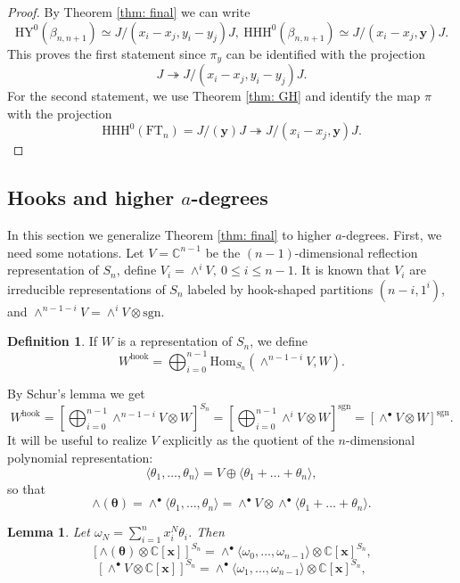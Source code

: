 \documentclass{amsart}
\newcommand{\C}{\mathbb{C}}
\newcommand{\xx}{\mathbf{x}}
\newcommand{\yy}{\mathbf{y}}
\newcommand{\ttheta}{\boldsymbol{\theta}}
\newcommand{\FT}{\mathrm{FT}}
\newcommand{\HY}{\mathrm{HY}}
\newcommand{\sgn}{\mathrm{sgn}}
\newcommand{\HHH}{\mathrm{HHH}}
\newcommand{\Hom}{\mathrm{Hom}}
\newcommand{\hook}{\mathrm{hook}}
\numberwithin{equation}{section}
\newtheorem{lemma}[theorem]{Lemma}
\theoremstyle{definition}
\newtheorem{definition}[theorem]{Definition}
\begin{document}
\begin{proof}
By Theorem \ref{thm: final} we can write
$$
\HY^0(\beta_{n,n+1})\simeq J/(x_i-x_j,y_i-y_j)J,\ \HHH^0(\beta_{n,n+1})\simeq J/(x_i-x_j,\yy)J.
$$
This proves the first statement since $\pi_y$ can be identified with the projection
$$
J\twoheadrightarrow J/(x_i-x_j,y_i-y_j)J.
$$
For the second statement, we use Theorem \ref{thm: GH} and identify the map $\pi$ with the projection
$$
\HHH^0(\FT_n)=J/(\yy)J\twoheadrightarrow J/(x_i-x_j,\yy)J.
$$
\end{proof}

\subsection{Hooks and higher $a$-degrees}
\label{sec: hooks}

In this section we  generalize Theorem \ref{thm: final} to higher $a$-degrees. First, we need some notations. Let $V=\C^{n-1}$ be the $(n-1)$-dimensional reflection representation of $S_n$, define $V_i=\wedge^{i}V,\ 0\le i\le n-1$. It is known that $V_i$ are irreducible representations of $S_n$ labeled by hook-shaped partitions $(n-i,1^{i})$, and $\wedge^{n-1-i}V=\wedge^iV\otimes \sgn$.

\begin{definition}
If $W$ is a representation of $S_n$, we define 
$$
W^{\hook}=\bigoplus_{i=0}^{n-1}\Hom_{S_n}(\wedge^{n-1-i}V,W).
$$
\end{definition}
By Schur's lemma we get
$$
W^{\hook}=\left[\bigoplus_{i=0}^{n-1}\wedge^{n-1-i}V\otimes W\right]^{S_n}=\left[\bigoplus_{i=0}^{n-1}\wedge^{i}V\otimes W\right]^{\sgn}=\left[\wedge^{\bullet}V\otimes W\right]^{\sgn}.
$$
It will be useful to realize $V$ explicitly as the quotient of the $n$-dimensional polynomial representation:
$$
\langle \theta_1,\ldots,\theta_n\rangle = V\oplus \langle \theta_1+\ldots+\theta_n\rangle,
$$
so that 
\begin{equation}
\label{eq: reduced wedge}
\wedge(\ttheta)=\wedge^{\bullet}\langle \theta_1,\ldots,\theta_n\rangle=\wedge^{\bullet} V\otimes \wedge^{\bullet}\langle\theta_1+\ldots+\theta_n\rangle.
\end{equation}

\begin{lemma}
\label{lem: solomon}
Let $\omega_N=\sum_{i=1}^nx_i^{N}\theta_i$. Then
$$
\left[\wedge(\ttheta)\otimes \C[\xx]\right]^{S_n}=\wedge^{\bullet}\langle 
\omega_0,\ldots,\omega_{n-1}\rangle \otimes \C[\xx]^{S_n},
$$
$$
\left[\wedge^{\bullet}V\otimes \C[\xx]\right]^{S_n}=\wedge^{\bullet}\langle 
\omega_1,\ldots,\omega_{n-1}\rangle \otimes \C[\xx]^{S_n},
$$
\end{lemma}
\end{document}
